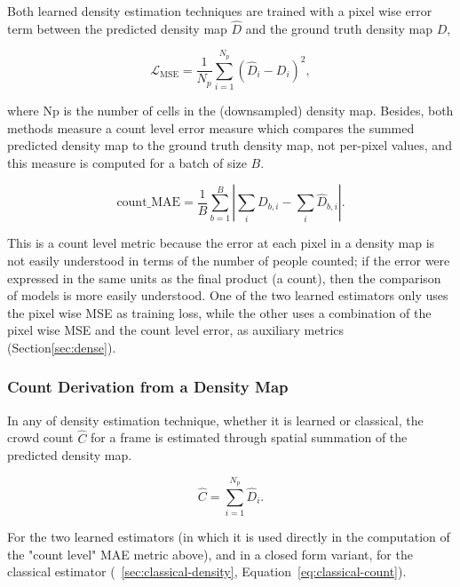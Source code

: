 Both learned density estimation techniques are trained with a pixel wise error term between the predicted density map $\hat D$ and the ground truth density map $D$,

\begin{equation}
	\mathcal{L}_{\text{MSE}} = \frac{1}{N_p}\sum_{i=1}^{N_p}\left(\hat D_i - D_i\right)^2,
\end{equation}

where Np is the number of cells in the (downsampled) density map. Besides, both methods measure a count level error measure which compares the summed predicted density map to the ground truth density map, not per-pixel values, and this measure is computed for a batch of size $B$.

\begin{equation}
	\text{count\_MAE} = \frac{1}{B}\sum_{b=1}^{B}\left|\sum_{i} D_{b,i} - \sum_{i} \hat D_{b,i}\right|.
\end{equation}

This is a count level metric because the error at each pixel in a density map is not easily understood in terms of the number of people counted; if the error were expressed in the same units as the final product (a count), then the comparison of models is more easily understood. One of the two learned estimators only uses the pixel wise MSE as training loss, while the other uses a combination of the pixel wise MSE and the count level error, as auxiliary metrics (Section\ref{sec:dense}).

\subsubsection{Count Derivation from a Density Map}

In any of density estimation technique, whether it is learned or classical, the crowd count $\hat C$ for a frame is estimated through spatial summation of the predicted density map.

\begin{equation}
	\hat C = \sum_{i=1}^{N_p} \hat D_i .
	\label{eq:density-sum}
\end{equation}

For the two learned estimators (in which it is used directly in the computation of the "count level" MAE metric above), and in a closed form variant, for the classical estimator (~\cref{sec:classical-density}, Equation~\ref{eq:classical-count}).




